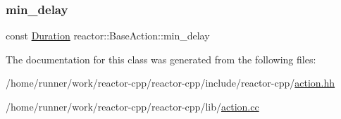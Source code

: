\subsubsection{\texorpdfstring{min\+\_\+delay}{min\_delay}}
{\footnotesize\ttfamily const \hyperlink{namespacereactor_aa8375b807a80703545664096c5b5b779}{Duration} reactor\+::\+Base\+Action\+::min\+\_\+delay\hspace{0.3cm}{\ttfamily [protected]}}



The documentation for this class was generated from the following files\+:\begin{DoxyCompactItemize}
\item 
/home/runner/work/reactor-\/cpp/reactor-\/cpp/include/reactor-\/cpp/\hyperlink{action_8hh}{action.\+hh}\item 
/home/runner/work/reactor-\/cpp/reactor-\/cpp/lib/\hyperlink{action_8cc}{action.\+cc}\end{DoxyCompactItemize}
